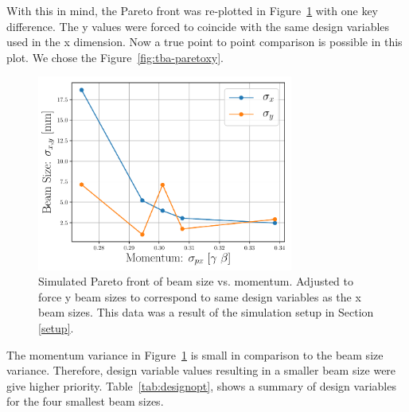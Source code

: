 With this in mind, the Pareto front was re-plotted in Figure~\ref{fig:tba-paretoxonly} 
with one key difference. The y values were forced to coincide with the same 
design variables used in the x dimension. 
Now a true point to point comparison is possible in this plot.
We chose the  Figure~\ref{fig:tba-paretoxy}. 
\iftrue
\begin{figure}
	\centering
	\includegraphics[width=0.75\textwidth]{./images/xonly_pareto_front_quads_before_Q5}
	\caption{Simulated Pareto front of beam size vs. momentum.
		Adjusted to force y beam sizes to correspond to same design variables 
		as the x beam sizes.
		This data was a result of the simulation setup in Section \ref{setup}.}
	\label{fig:tba-paretoxonly}
\end{figure}
\fi
The momentum variance in Figure~\ref{fig:tba-paretoxonly} is small in comparison to 
the beam size variance. Therefore, design variable values resulting in a smaller 
beam size were give higher priority. Table~\ref{tab:designopt}, shows a summary of 
design variables for the four smallest beam sizes.

